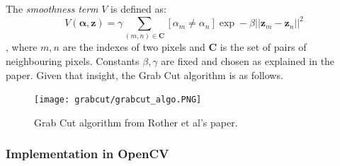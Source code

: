 \documentclass[a4paper]{article}
\begin{document}
The \textit{smoothness term} $V$ is defined as:
\begin{equation}
    V(\boldsymbol{\alpha},\textbf{z}) = \gamma \sum\limits_{(m,n) \in \textbf{C}}[\alpha_m \neq \alpha_n] \exp -\beta \left|\left|\textbf{z}_m - \textbf{z}_n \right|\right|^2
\end{equation}
, where $m, n$ are the indexes of two pixels and $\textbf{C}$ is the set of pairs of neighbouring pixels. Constants $\beta, \gamma$ are fixed and chosen as explained in the paper. Given that insight, the Grab Cut algorithm is as follows.
\begin{figure}
    \centering
    \texttt{[image: grabcut/grabcut\_algo.PNG]}
    \caption{Grab Cut algorithm from Rother et al's paper.}
\end{figure}

\subsubsection{Implementation in OpenCV}
\end{document}

